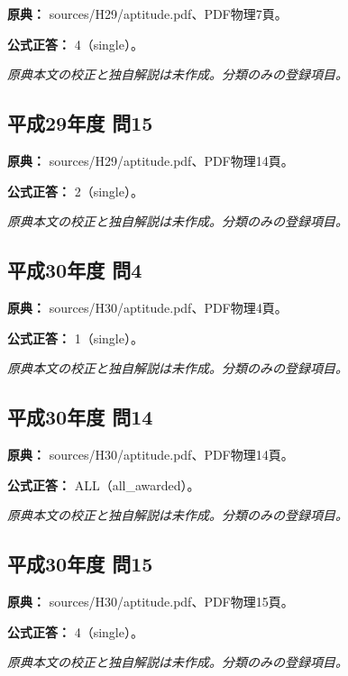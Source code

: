 \noindent\textbf{原典：} sources/H29/aptitude.pdf、PDF物理7頁。

\textbf{公式正答：} 4（single）。

\par\textit{原典本文の校正と独自解説は未作成。分類のみの登録項目。}

\subsection{平成29年度 問15}
\label{q:h29-reg-apt-15}

\noindent\textbf{原典：} sources/H29/aptitude.pdf、PDF物理14頁。

\textbf{公式正答：} 2（single）。

\par\textit{原典本文の校正と独自解説は未作成。分類のみの登録項目。}

\subsection{平成30年度 問4}
\label{q:h30-reg-apt-04}

\noindent\textbf{原典：} sources/H30/aptitude.pdf、PDF物理4頁。

\textbf{公式正答：} 1（single）。

\par\textit{原典本文の校正と独自解説は未作成。分類のみの登録項目。}

\subsection{平成30年度 問14}
\label{q:h30-reg-apt-14}

\noindent\textbf{原典：} sources/H30/aptitude.pdf、PDF物理14頁。

\textbf{公式正答：} ALL（all\_awarded）。

\par\textit{原典本文の校正と独自解説は未作成。分類のみの登録項目。}

\subsection{平成30年度 問15}
\label{q:h30-reg-apt-15}

\noindent\textbf{原典：} sources/H30/aptitude.pdf、PDF物理15頁。

\textbf{公式正答：} 4（single）。

\par\textit{原典本文の校正と独自解説は未作成。分類のみの登録項目。}

